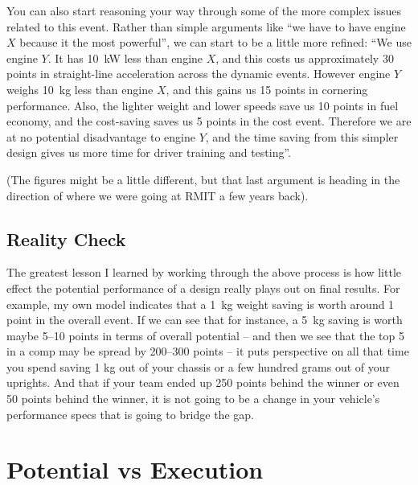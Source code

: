 \documentclass[10pt, a4paper, article, oneside, twocolumn, final]{memoir}
\begin{document}
You can also start reasoning your way through some of the more complex issues related to this event. Rather than simple arguments like “we have to have engine $X$ because it the most powerful”, we can start to be a little more refined: “We use engine $Y$. It has \SI{10}{\kilo\watt} less than engine $X$, and this costs us approximately \num{30} points in straight-line acceleration across the dynamic events. However engine $Y$ weighs \SI{10}{\kilogram} less than engine $X$, and this gains us \num{15} points in cornering performance. Also, the lighter weight and lower speeds save us \num{10} points in fuel economy, and the cost-saving saves us \num{5} points in the cost event. Therefore we are at no potential disadvantage to engine $Y$, and the time saving from this simpler design gives us more time for driver training and testing”. 

(The figures might be a little different, but that last argument is heading in the direction of where we were going at RMIT a few years back). 

\section*{Reality Check}

The greatest lesson I learned by working through the above process is how little effect the potential performance of a design really plays out on final results. For example, my own model indicates that a \SI{1}{\kilogram} weight saving is worth around \num{1} point in the overall event. If we can see that for instance, a \SI{5}{\kilogram} saving is worth maybe \numrange{5}{10} points in terms of overall potential -- and then we see that the top 5 in a comp may be spread by \numrange{200}{300} points -- it puts perspective on all that time you spend saving 1 kg out of your chassis or a few hundred grams out of your uprights. And that if your team ended up \num{250} points behind the winner or even \num{50} points behind the winner, it is not going to be a change in your vehicle’s performance specs that is going to bridge the gap.



\chapter*{Potential vs Execution}
\end{document}
